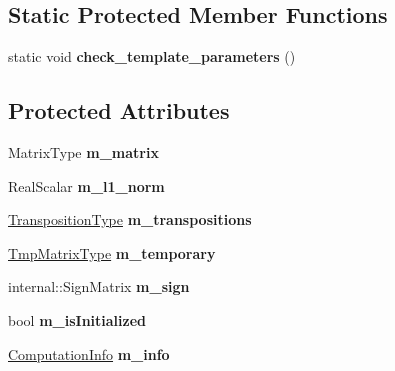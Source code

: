 \subsection*{Static Protected Member Functions}
\begin{DoxyCompactItemize}
\item 
\mbox{\label{class_eigen_1_1_l_d_l_t_a711e8c7ef91a42a30f4be6df18c2fcc4}} 
static void {\bfseries check\+\_\+template\+\_\+parameters} ()
\end{DoxyCompactItemize}
\subsection*{Protected Attributes}
\begin{DoxyCompactItemize}
\item 
\mbox{\label{class_eigen_1_1_l_d_l_t_a153948da33949f4563c05c07d57c18eb}} 
Matrix\+Type {\bfseries m\+\_\+matrix}
\item 
\mbox{\label{class_eigen_1_1_l_d_l_t_a84fdac857f2dfc074484656a228936bb}} 
Real\+Scalar {\bfseries m\+\_\+l1\+\_\+norm}
\item 
\mbox{\label{class_eigen_1_1_l_d_l_t_a04f7ed53ae4862aedd1060a768e36ce3}} 
\mbox{\hyperlink{class_eigen_1_1_transpositions}{Transposition\+Type}} {\bfseries m\+\_\+transpositions}
\item 
\mbox{\label{class_eigen_1_1_l_d_l_t_ad48da194d7275c2d046362ee3bf67bf4}} 
\mbox{\hyperlink{class_eigen_1_1_matrix}{Tmp\+Matrix\+Type}} {\bfseries m\+\_\+temporary}
\item 
\mbox{\label{class_eigen_1_1_l_d_l_t_a2fded8bbfe0effc0456ab309543a632a}} 
internal\+::\+Sign\+Matrix {\bfseries m\+\_\+sign}
\item 
\mbox{\label{class_eigen_1_1_l_d_l_t_aef70622f08af966e5f263464c1f1d4f7}} 
bool {\bfseries m\+\_\+is\+Initialized}
\item 
\mbox{\label{class_eigen_1_1_l_d_l_t_a317b4095fbf24f0fb83476980aa758df}} 
\mbox{\hyperlink{group__enums_ga85fad7b87587764e5cf6b513a9e0ee5e}{Computation\+Info}} {\bfseries m\+\_\+info}
\end{DoxyCompactItemize}


